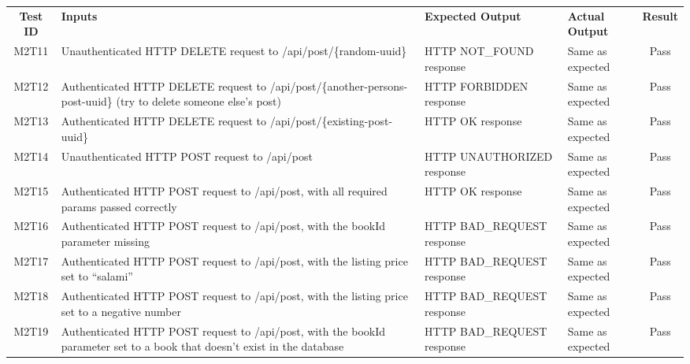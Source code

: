 \documentclass[fullpage]{article}
\begin{document}
\begin{table}[H]
\flushleft
\begin{tabular}{|c|p{4.5cm}|p{3.6cm}|p{3.6cm}|c|}
\hline
 \rowcolor{lightgray} 
\textbf{Test ID} &\textbf{Inputs} &\textbf{Expected Output} &\textbf{Actual Output} &\textbf{Result}\\
M2T11 & Unauthenticated HTTP DELETE request to /api/post/\{random-uuid\} & HTTP NOT\_FOUND response & Same as expected &  Pass \\
\hline
M2T12 & Authenticated HTTP DELETE request to /api/post/\{another-persons-post-uuid\} (try to delete someone else's post) & HTTP FORBIDDEN response & Same as expected & Pass \\
\hline
M2T13 & Authenticated HTTP DELETE request to /api/post/\{existing-post-uuid\} & HTTP OK response & Same as expected & Pass \\
\hline
M2T14 & Unauthenticated HTTP POST request to /api/post & HTTP UNAUTHORIZED response & Same as expected & Pass \\
\hline
M2T15 & Authenticated HTTP POST request to /api/post, with all required params passed correctly & HTTP OK response & Same as expected & Pass \\
\hline
M2T16 & Authenticated HTTP POST request to /api/post, with the bookId parameter missing & HTTP BAD\_REQUEST response & Same as expected & Pass \\
\hline
M2T17 & Authenticated HTTP POST request to /api/post, with the listing price set to ``salami'' & HTTP BAD\_REQUEST response & Same as expected & Pass \\
\hline
M2T18 & Authenticated HTTP POST request to /api/post, with the listing price set to a negative number & HTTP BAD\_REQUEST response & Same as expected & Pass \\
\hline
M2T19 & Authenticated HTTP POST request to /api/post, with the bookId parameter set to a book that doesn't exist in the database & HTTP BAD\_REQUEST response & Same as expected & Pass \\
\hline

\end{tabular}
\end{table}
\end{document}

